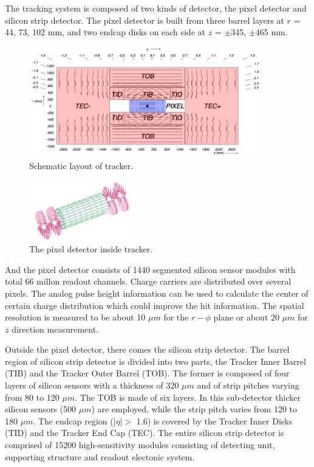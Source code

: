 The tracking system is composed of two kinds of detector, the pixel detector and silicon strip detector. The pixel detector is built from three barrel layers at $r$ = 44, 73, 102 mm, and two endcap disks on each side at $z$ = $\pm$345, $\pm$465 mm.
\begin{figure}[hbtp]
  \begin{center}
    \includegraphics[width=0.9\textwidth]{figure/CH2/tracker.png}
  \end{center}
  \caption{\label{fig:tracker}Schematic layout of tracker.}
\end{figure}
\begin{figure}[hbtp]
  \begin{center}
    \includegraphics[width=0.4\textwidth]{figure/CH2/pixel.png}
  \end{center}
  \caption{\label{fig:pixel}The pixel detector inside tracker.}
\end{figure}
\newline And the pixel detector consists of 1440 segmented silicon sensor modules with total 66 millon readout channels. Charge carriers are distributed over several pixels. The analog pulse height information can be used to calculate the center of certain charge distribution which could improve the hit information. The spatial resolution is measured to be about 10 $\mu m$ for the $r-\phi$ plane or about 20 $\mu m$ for $z$ direction measurement.

Outside the pixel detector, there comes the silicon strip detector. The barrel region of silicon strip detector is divided into two parts, the Tracker Inner Barrel (TIB) and the Tracker Outer Barrel (TOB). The former is composed of four layers of silicon sensors with a thickness of 320 $\mu m$ and of strip pitches varying from 80 to 120 $\mu m$. The TOB is made of six layers. In this sub-detector thicker silicon sensors (500 $\mu m$) are employed, while the strip pitch varies from 120 to 180 $\mu m$. The endcap region ($|\eta| >$ 1.6) is covered by the Tracker Inner Disks (TID) and the Tracker End Cap (TEC). The entire silicon strip detector is comprised of 15200 high-sensitivity modules consisting of detecting unit, supporting structure and readout electonic system.

